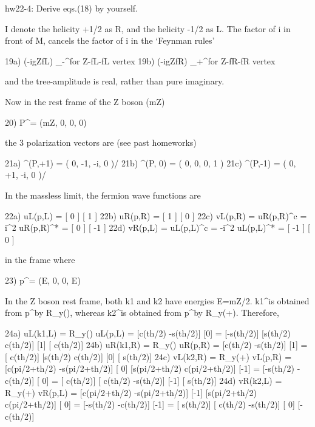 \documentclass[12pt]{article}
\def\eps{\epsilon}
\begin{document}
{{hw22-4:  Derive eqs.(18) by yourself.

I denote the helicity +1/2 as R, and the helicity -1/2 as L.
The factor of i in front of M, cancels the factor of i
in the `Feynman rules'

19a) (-igZfL) \sigma_-^\mu    for Z-fL-fL vertex
19b) (-igZfR) \sigma_+^\mu    for Z-fR-fR vertex

and the tree-amplitude is real, rather than pure imaginary.

Now in the rest frame of the Z boson (mZ)

20) P^\mu  = (mZ, 0, 0, 0)

the 3 polarization vectors are (see past homeworks)

21a) \eps^\mu(P,+1) = ( 0, -1, -i, 0 )/
21b) \eps^\mu(P, 0) = ( 0,  0,  0, 1 )
21c) \eps^\mu(P,-1) = ( 0, +1, -i, 0 )/

In the massless limit, the fermion wave functions are

22a) uL(p,L) =  [ 0 ]
                         [ 1 ]
22b) uR(p,R) =  [ 1 ]
                         [ 0 ]
22c) vL(p,R) = uR(p,R)^c =  i\sigma^2 uR(p,R)^* =  [  0 ]
                                                          [ -1 ]
22d) vR(p,L) = uL(p,L)^c = -i\sigma^2 uL(p,L)^* =  [ -1 ]
                                                          [  0 ]

in the frame where

23) p^\mu = (E, 0, 0, E)

In the Z boson rest frame, both k1 and k2 have energies E=mZ/2.
k1^\mu is obtained from p^\mu by R_y(\theta), whereas k2^\mu is
obtained from p^\mu by R_y(\theta+\pi).  Therefore,

24a) uL(k1,L) = R_y(\theta) uL(p,L)
              =  [c(th/2) -s(th/2)] [0] =  [-s(th/2)]
                        [s(th/2)  c(th/2)] [1]           [ c(th/2)]
24b) uR(k1,R) = R_y(\theta) uR(p,R)
              =  [c(th/2) -s(th/2)] [1] =  [ c(th/2)]
                        [s(th/2)  c(th/2)] [0]           [ s(th/2)]
24c) vL(k2,R) = R_y(\pi+\theta) vL(p,R)
              =  [c(pi/2+th/2) -s(pi/2+th/2)] [ 0]
                        [s(pi/2+th/2)  c(pi/2+th/2)] [-1]
              =  [-s(th/2) -c(th/2)] [ 0] =  [ c(th/2)]
                        [ c(th/2) -s(th/2)] [-1]           [ s(th/2)]
24d) vR(k2,L) = R_y(\pi+\theta) vR(p,L)
              =  [c(pi/2+th/2) -s(pi/2+th/2)] [-1]
                        [s(pi/2+th/2)  c(pi/2+th/2)] [ 0]
              =  [-s(th/2) -c(th/2)] [-1] =  [ s(th/2)]
                        [ c(th/2) -s(th/2)] [ 0]           [-c(th/2)]

}}
\end{document}

